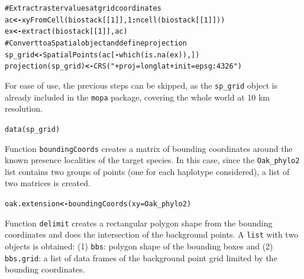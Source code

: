 \documentclass[10pt,a4paper]{article}\usepackage[]{graphicx}\usepackage[]{color}
\makeatletter
\newcommand{\hlnum}[1]{\textcolor[rgb]{0.533,0,0.133}{#1}}%
\newcommand{\hlstr}[1]{\textcolor[rgb]{0.667,0.267,0}{#1}}%
\newcommand{\hlcom}[1]{\textcolor[rgb]{1,0.533,0}{#1}}%
\newcommand{\hlopt}[1]{\textcolor[rgb]{0,0,0}{\textbf{#1}}}%
\newcommand{\hlstd}[1]{\textcolor[rgb]{0,0,0}{#1}}%
\newcommand{\hlkwb}[1]{\textcolor[rgb]{0,0,0.4}{\textbf{#1}}}%
\newcommand{\hlkwc}[1]{\textcolor[rgb]{0,0,0.4}{#1}}%
\newcommand{\hlkwd}[1]{\textcolor[rgb]{0,0.267,0.4}{#1}}%
\newenvironment{kframe}{%
 \def\at@end@of@kframe{}%
 \ifinner\ifhmode%
  \def\at@end@of@kframe{\end{minipage}}%
  \begin{minipage}{\columnwidth}%
 \fi\fi%
 \def\FrameCommand##1{\hskip\@totalleftmargin \hskip-\fboxsep
 \colorbox{shadecolor}{##1}\hskip-\fboxsep
     \hskip-\linewidth \hskip-\@totalleftmargin \hskip\columnwidth}%
 \MakeFramed {\advance\hsize-\width
   \@totalleftmargin\z@ \linewidth\hsize
   \@setminipage}}%
 {\par\unskip\endMakeFramed%
 \at@end@of@kframe}
\newenvironment{knitrout}{}{} %
\makeatother
\begin{document}
\begin{knitrout}
\color{fgcolor}\begin{kframe}
\begin{alltt}
\hlcom{# Extract raster values at grid coordinates}
\hlstd{ac} \hlkwb{<-} \hlkwd{xyFromCell}\hlstd{(biostack[[}\hlnum{1}\hlstd{]],} \hlnum{1}\hlopt{:}\hlkwd{ncell}\hlstd{(biostack[[}\hlnum{1}\hlstd{]]))}
\hlstd{ex} \hlkwb{<-} \hlkwd{extract}\hlstd{(biostack[[}\hlnum{1}\hlstd{]], ac)}
\hlcom{# Convert to a Spatial object and define projection}
\hlstd{sp_grid} \hlkwb{<-} \hlkwd{SpatialPoints}\hlstd{(ac[}\hlopt{-}\hlkwd{which}\hlstd{(}\hlkwd{is.na}\hlstd{(ex)), ])}
\hlkwd{projection}\hlstd{(sp_grid)} \hlkwb{<-} \hlkwd{CRS}\hlstd{(}\hlstr{"+proj=longlat +init=epsg:4326"}\hlstd{)}
\end{alltt}
\end{kframe}
\end{knitrout}

For ease of use, the previous steps can be skipped, as the \texttt{sp\_grid} object is already included in the \texttt{mopa} package, covering the whole world at 10 km resolution.

\begin{knitrout}
\color{fgcolor}\begin{kframe}
\begin{alltt}
\hlkwd{data}\hlstd{(sp_grid)}
\end{alltt}
\end{kframe}
\end{knitrout}

Function \texttt{boundingCoords} creates a matrix of bounding coordinates around the known presence localities of the target species. In this case, since the \texttt{Oak\_phylo2} list contains two groups of points (one for each haplotype considered), a list of two matrices is created.

\begin{knitrout}
\color{fgcolor}\begin{kframe}
\begin{alltt}
 \hlstd{oak.extension} \hlkwb{<-} \hlkwd{boundingCoords}\hlstd{(}\hlkwc{xy} \hlstd{= Oak_phylo2)}
\end{alltt}
\end{kframe}
\end{knitrout}

Function \texttt{delimit} creates a rectangular polygon shape from the bounding coordinates and does the intersection of the background points. A \texttt{list} with two objects is obtained: (1) \texttt{bbs}: polygon shape of the bounding boxes and (2) \texttt{bbs.grid}: a list of data frames of the background point grid limited by the bounding coordinates.
\end{document}
